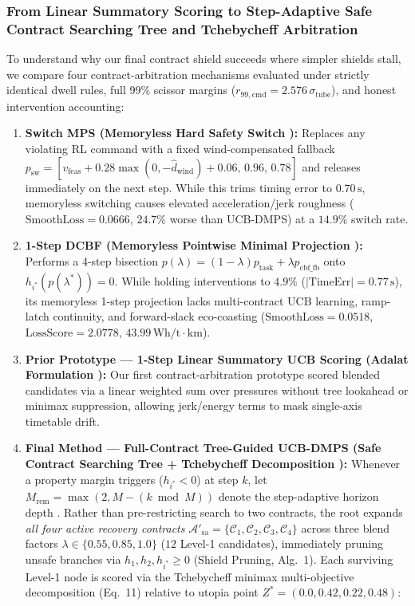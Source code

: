 \documentclass[10pt,a4paper]{article}
\begin{document}
\subsubsection{From Linear Summatory Scoring to Step-Adaptive Safe Contract Searching Tree and Tchebycheff Arbitration}
To understand why our final contract shield succeeds where simpler shields stall, we compare four contract-arbitration mechanisms evaluated under strictly identical dwell rules, full 99\% scissor margins ($r_{99,\text{cmd}} = 2.576\,\sigma_{\text{tube}}$), and honest intervention accounting:
\begin{enumerate}
    \item \textbf{Switch MPS (Memoryless Hard Safety Switch \cite{ref3, ref32}):} Replaces any violating RL command with a fixed wind-compensated fallback $p_{\text{sw}} = [v_{\text{feas}} + 0.28\max(0,-\hat{d}_{\text{wind}}) + 0.06, \, 0.96, \, 0.78]$ and releases immediately on the next step. While this trims timing error to $0.70\,\text{s}$, memoryless switching causes elevated acceleration/jerk roughness ($\text{SmoothLoss} = 0.0666$, $24.7\%$ worse than UCB-DMPS) at a $14.9\%$ switch rate.
    \item \textbf{1-Step DCBF (Memoryless Pointwise Minimal Projection \cite{ref6, ref7}):} Performs a 4-step bisection $p(\lambda) = (1-\lambda)p_{\text{task}} + \lambda p_{\text{cbf\_fb}}$ onto $h_{i^*}(p(\lambda^*)) = 0$. While holding interventions to $4.9\%$ ($|\text{TimeErr}| = 0.77\,\text{s}$), its memoryless 1-step projection lacks multi-contract UCB learning, ramp-latch continuity, and forward-slack eco-coasting ($\text{SmoothLoss} = 0.0518$, $\text{LossScore} = 2.0778$, $43.99\,\text{Wh/t}\cdot\text{km}$).
    \item \textbf{Prior Prototype — 1-Step Linear Summatory UCB Scoring (Adalat Formulation \cite{ref11}):} Our first contract-arbitration prototype scored blended candidates via a linear weighted sum over pressures without tree lookahead or minimax suppression, allowing jerk/energy terms to mask single-axis timetable drift.
    \item \textbf{Final Method — Full-Contract Tree-Guided UCB-DMPS (Safe Contract Searching Tree + Tchebycheff Decomposition \cite{ref22, ref21, ref11}):} Whenever a property margin triggers ($h_{i^*} < 0$) at step $k$, let $M_{\text{rem}} = \max(2, M - (k \bmod M))$ denote the step-adaptive horizon depth \cite{ref22}. Rather than pre-restricting search to two contracts, the root expands \emph{all four active recovery contracts} $\mathcal{A}'_{\text{sa}} = \{\mathcal{C}_1, \mathcal{C}_2, \mathcal{C}_3, \mathcal{C}_4\}$ across three blend factors $\lambda \in \{0.55, 0.85, 1.0\}$ ($12$ Level-1 candidates), immediately pruning unsafe branches via $h_1, h_2, h_{i^*} \ge 0$ (Shield Pruning, \cite{ref22} Alg.~1). Each surviving Level-1 node is scored via the Tchebycheff minimax multi-objective decomposition \cite{ref21} (Eq.~11) relative to utopia point $Z^* = (0.0, 0.42, 0.22, 0.48)$:

\end{enumerate}
\end{document}
